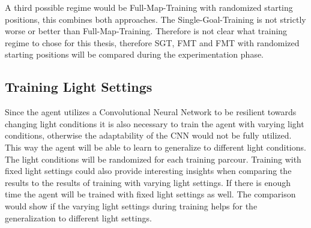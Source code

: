 A third possible regime would be Full-Map-Training with randomized starting positions, this combines both approaches. The Single-Goal-Training is not strictly worse or better than Full-Map-Training. Therefore is not clear what training regime to chose for this thesis, therefore SGT, FMT and FMT with randomized starting positions will be compared during the experimentation phase.

\subsection*{Training Light Settings}
Since the agent utilizes a Convolutional Neural Network to be resilient towards changing light conditions it is also necessary to train the agent with varying light conditions, otherwise the adaptability of the CNN would not be fully utilized. This way the agent will be able to learn to generalize to different light conditions. The light conditions will be randomized for each training parcour.
Training with fixed light settings could also provide interesting insights when comparing the results to the results of training with varying light settings. If there is enough time the agent will be trained with fixed light settings as well. The comparison would show if the varying light settings during training helps for the generalization to different light settings.


